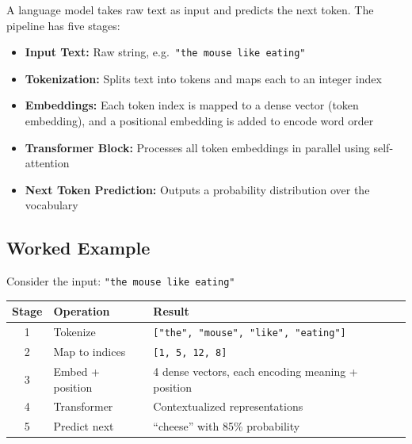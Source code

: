 \documentclass[11pt,a4paper]{article}
\begin{document}
A language model takes raw text as input and predicts the next token. The pipeline has five stages:

\begin{center}
\end{center}

\begin{itemize}[leftmargin=1.5em]
    \item \textbf{Input Text:} Raw string, e.g.\ \texttt{"the mouse like eating"}
    \item \textbf{Tokenization:} Splits text into tokens and maps each to an integer index
    \item \textbf{Embeddings:} Each token index is mapped to a dense vector (token embedding), and a positional embedding is added to encode word order
    \item \textbf{Transformer Block:} Processes all token embeddings in parallel using self-attention
    \item \textbf{Next Token Prediction:} Outputs a probability distribution over the vocabulary
\end{itemize}

\subsection{Worked Example}

Consider the input: \texttt{"the mouse like eating"}

\begin{center}
\renewcommand{\arraystretch}{1.3}
\begin{tabular}{@{}clp{7.5cm}@{}}
\toprule
\textbf{Stage} & \textbf{Operation} & \textbf{Result} \\
\midrule
1 & Tokenize & \texttt{["the", "mouse", "like", "eating"]} \\
2 & Map to indices & \texttt{[1, 5, 12, 8]} \\
3 & Embed + position & 4 dense vectors, each encoding meaning + position \\
4 & Transformer & Contextualized representations \\
5 & Predict next & ``cheese'' with 85\% probability \\
\bottomrule
\end{tabular}
\end{center}
\end{document}
